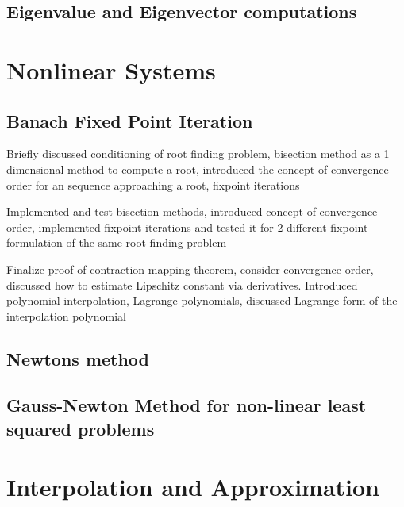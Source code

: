 \documentclass{article}
\theoremstyle{remark}
\begin{document}
\subsection{Eigenvalue and Eigenvector computations}%
\label{sub:eigenvalue_and_eigenvector_computations}

\newpage
\section{Nonlinear Systems}%
\label{sec:nonlinear_systems}

\subsection{Banach Fixed Point Iteration}%
\label{sub:banach_fixed_point_iteration}
\begin{tcolorbox}
  Briefly discussed conditioning of root finding problem, bisection method as a 1 dimensional method to compute a root, introduced the concept of convergence order for an sequence approaching a root, fixpoint iterations

\end{tcolorbox}

\begin{tcolorbox}
  Implemented and test bisection methods, introduced concept of convergence order, implemented fixpoint iterations and tested it for 2 different fixpoint formulation of the same root finding problem 
\end{tcolorbox}

\begin{tcolorbox}
  Finalize proof of contraction mapping theorem, consider convergence order, discussed how to estimate Lipschitz constant via derivatives. Introduced polynomial interpolation, Lagrange polynomials, discussed Lagrange form of the interpolation polynomial	
\end{tcolorbox}
\subsection{Newtons method}%
\label{sub:newtons_method}

\subsection{Gauss-Newton Method for non-linear least squared problems}%
\label{sub:gauss_newton_method_for_non_linear_least_squared_problems}

\newpage
\section{Interpolation and Approximation}%
\label{sec:interpolation_and_approximation}
\end{document}
